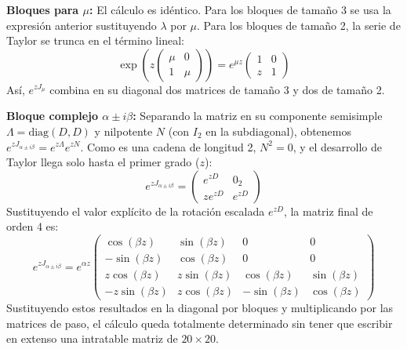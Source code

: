 {    \textbf{Bloques para $\mu$:}
    El cálculo es idéntico. Para los bloques de tamaño 3 se usa la expresión anterior sustituyendo $\lambda$ por $\mu$. Para los bloques de tamaño 2, la serie de Taylor se trunca en el término lineal:
    \[
        \exp\left( z \begin{pmatrix} \mu & 0 \\ 1 & \mu \end{pmatrix} \right) = 
        e^{\mu z} \begin{pmatrix} 
            1 & 0 \\ 
            z & 1 
        \end{pmatrix}
    \]
    Así, $e^{z J_\mu}$ combina en su diagonal dos matrices de tamaño 3 y dos de tamaño 2.

    \textbf{Bloque complejo $\alpha \pm i\beta$:}
    Separando la matriz en su componente semisimple $\Lambda = \text{diag}(D, D)$ y nilpotente $N$ (con $I_2$ en la subdiagonal), obtenemos $e^{z J_{\alpha \pm i\beta}} = e^{z\Lambda} e^{zN}$. Como es una cadena de longitud 2, $N^2 = 0$, y el desarrollo de Taylor llega solo hasta el primer grado ($z$):
    \[
        e^{z J_{\alpha \pm i\beta}} = 
        \begin{pmatrix} 
            e^{zD} & 0_2 \\ 
            z e^{zD} & e^{zD} 
        \end{pmatrix}
    \]
    Sustituyendo el valor explícito de la rotación escalada $e^{zD}$, la matriz final de orden 4 es:
    \[
        e^{z J_{\alpha \pm i\beta}} = e^{\alpha z}
        \begin{pmatrix}
            \cos(\beta z) & \sin(\beta z) & 0 & 0 \\
            -\sin(\beta z) & \cos(\beta z) & 0 & 0 \\
            z\cos(\beta z) & z\sin(\beta z) & \cos(\beta z) & \sin(\beta z) \\
            -z\sin(\beta z) & z\cos(\beta z) & -\sin(\beta z) & \cos(\beta z)
        \end{pmatrix}
    \]
    Sustituyendo estos resultados en la diagonal por bloques y multiplicando por las matrices de paso, el cálculo queda totalmente determinado sin tener que escribir en extenso una intratable matriz de $20 \times 20$.

}

